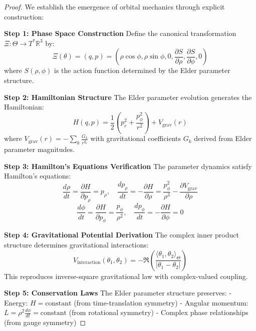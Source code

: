 \begin{proof}
We establish the emergence of orbital mechanics through explicit construction:

\textbf{Step 1: Phase Space Construction}
Define the canonical transformation $\Xi: \Theta \rightarrow T^*\mathbb{R}^3$ by:
$$\Xi(\theta) = (q, p) = (\rho \cos \phi, \rho \sin \phi, 0, \frac{\partial S}{\partial \rho}, \frac{\partial S}{\partial \phi}, 0)$$
where $S(\rho, \phi)$ is the action function determined by the Elder parameter structure.

\textbf{Step 2: Hamiltonian Structure}
The Elder parameter evolution generates the Hamiltonian:
$$H(q, p) = \frac{1}{2}(p_r^2 + \frac{p_\phi^2}{r^2}) + V_{\text{grav}}(r)$$
where $V_{\text{grav}}(r) = -\sum_{k} \frac{G_k}{r^{g_k}}$ with gravitational coefficients $G_k$ derived from Elder parameter magnitudes.

\textbf{Step 3: Hamilton's Equations Verification}
The parameter dynamics satisfy Hamilton's equations:
$$\frac{d\rho}{dt} = \frac{\partial H}{\partial p_\rho} = p_\rho, \quad \frac{dp_\rho}{dt} = -\frac{\partial H}{\partial \rho} = \frac{p_\phi^2}{\rho^3} - \frac{\partial V_{\text{grav}}}{\partial \rho}$$
$$\frac{d\phi}{dt} = \frac{\partial H}{\partial p_\phi} = \frac{p_\phi}{\rho^2}, \quad \frac{dp_\phi}{dt} = -\frac{\partial H}{\partial \phi} = 0$$

\textbf{Step 4: Gravitational Potential Derivation}
The complex inner product structure determines gravitational interactions:
$$V_{\text{interaction}}(\theta_1, \theta_2) = -\Re\left(\frac{\langle \theta_1, \theta_2 \rangle_\Theta}{|\theta_1 - \theta_2|}\right)$$
This reproduces inverse-square gravitational law with complex-valued coupling.

\textbf{Step 5: Conservation Laws}
The Elder parameter structure preserves:
- Energy: $H = \text{constant}$ (from time-translation symmetry)
- Angular momentum: $L = \rho^2 \frac{d\phi}{dt} = \text{constant}$ (from rotational symmetry)
- Complex phase relationships (from gauge symmetry)
\end{proof}

